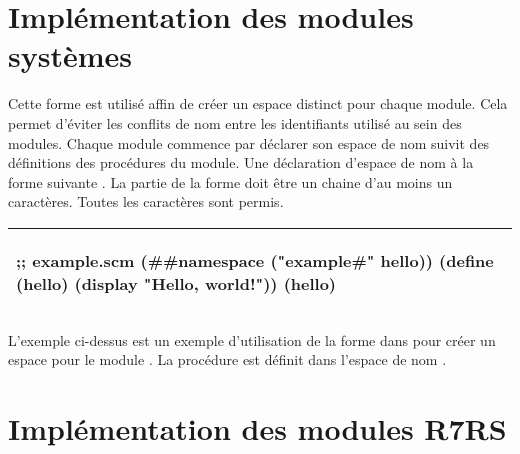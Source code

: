 \section{Implémentation des modules systèmes}

Cette forme est utilisé affin de créer un espace distinct pour chaque module.
Cela permet d'éviter les conflits de nom entre les identifiants utilisé au sein
des modules.  Chaque module commence par déclarer son espace de nom suivit des
définitions des procédures du module.  Une déclaration d'espace de nom à la
forme suivante . La partie 
de la forme  doit être un chaine d'au moins un caractères.
Toutes les caractères sont permis.

\begin{center}
  \begin{tabular}{|l|}
\hline
\begin{mplisting}{0.6}
;; example.scm
(##namespace ("example#" hello))
(define (hello)
  (display "Hello, world!\n"))
(hello)
\end{mplisting}\\\hline
  \end{tabular}
\end{center}
L'exemple ci-dessus est un exemple d'utilisation de la forme 
dans pour créer un espace pour le module . La procédure 
est définit dans l'espace de nom .

\section{Implémentation des modules R7RS}
